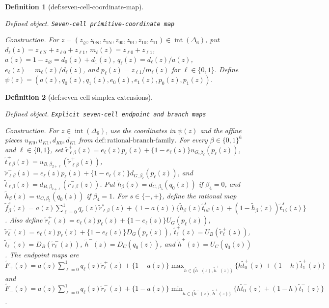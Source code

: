 \documentclass{article}
\newtheorem{definition}{Definition}
\begin{document}
\begin{definition}[def:seven-cell-coordinate-map]\label{def:seven-cell-coordinate-map}
\par\smallskip\noindent\emph{Defined object.} \texttt{Seven-\allowbreak{}cell primitive-\allowbreak{}coordinate map}
\par\smallskip\noindent\emph{Construction.} For \(z=(z_\varnothing,z_{0\mathrm N},z_{1\mathrm N},z_{00},z_{01},z_{10},z_{11})\in\operatorname{int}(\Delta_6)\), put \(d_\ell(z)=z_{\ell\mathrm N}+z_{\ell0}+z_{\ell1}\), \(m_\ell(z)=z_{\ell0}+z_{\ell1}\), \(a(z)=1-z_\varnothing=d_0(z)+d_1(z)\), \(q_\ell(z)=d_\ell(z)/a(z)\), \(e_\ell(z)=m_\ell(z)/d_\ell(z)\), and \(p_\ell(z)=z_{\ell1}/m_\ell(z)\) for \(\ell\in\{0,1\}\). Define \(\psi(z)=(a(z),q_0(z),q_1(z),e_0(z),e_1(z),p_0(z),p_1(z))\).
\end{definition}

\begin{definition}[def:seven-cell-simplex-extensions]\label{def:seven-cell-simplex-extensions}
\par\smallskip\noindent\emph{Defined object.} \texttt{Explicit seven-\allowbreak{}cell endpoint and branch maps}
\par\smallskip\noindent\emph{Construction.} For \(z\in\operatorname{int}(\Delta_6)\), use the coordinates in \(\psi(z)\) and the affine pieces \(u_{K0},u_{K1},d_{K0},d_{K1}\) from \(\mathrm{def{:}rational\text{-}branch\text{-}family}\). For every \(\beta\in\{0,1\}^6\) and \(\ell\in\{0,1\}\), set \(\widetilde r_{\ell\beta}^+(z)=e_\ell(z)p_\ell(z)+\{1-e_\ell(z)\}u_{G,\beta_\ell}(p_\ell(z))\), \(\widetilde t_{\ell\beta}^+(z)=u_{B,\beta_{2+\ell}}(\widetilde r_{\ell\beta}^+(z))\), \(\widetilde r_{\ell\beta}^-(z)=e_\ell(z)p_\ell(z)+\{1-e_\ell(z)\}d_{G,\beta_\ell}(p_\ell(z))\), and \(\widetilde t_{\ell\beta}^-(z)=d_{B,\beta_{2+\ell}}(\widetilde r_{\ell\beta}^-(z))\). Put \(\widetilde h_\beta(z)=d_{C,\beta_5}(q_0(z))\) if \(\beta_4=0\), and \(\widetilde h_\beta(z)=u_{C,\beta_5}(q_0(z))\) if \(\beta_4=1\). For \(s\in\{-,+\}\), define the rational map \(\widetilde f_\beta^s(z)=a(z)\sum_{\ell=0}^1q_\ell(z)\widetilde r_{\ell\beta}^s(z)+(1-a(z))\{\widetilde h_\beta(z)\widetilde t_{0\beta}^s(z)+(1-\widetilde h_\beta(z))\widetilde t_{1\beta}^s(z)\}\). Also define \(\widetilde r_\ell^+(z)=e_\ell(z)p_\ell(z)+\{1-e_\ell(z)\}U_G(p_\ell(z))\), \(\widetilde r_\ell^-(z)=e_\ell(z)p_\ell(z)+\{1-e_\ell(z)\}D_G(p_\ell(z))\), \(\widetilde t_\ell^+(z)=U_B(\widetilde r_\ell^+(z))\), \(\widetilde t_\ell^-(z)=D_B(\widetilde r_\ell^-(z))\), \(\widetilde h^-(z)=D_C(q_0(z))\), and \(\widetilde h^+(z)=U_C(q_0(z))\). The endpoint maps are \(\widetilde F_+(z)=a(z)\sum_{\ell=0}^1q_\ell(z)\widetilde r_\ell^+(z)+\{1-a(z)\}\max_{h\in\{\widetilde h^-(z),\widetilde h^+(z)\}}\{h\widetilde t_0^+(z)+(1-h)\widetilde t_1^+(z)\}\) and \(\widetilde F_-(z)=a(z)\sum_{\ell=0}^1q_\ell(z)\widetilde r_\ell^-(z)+\{1-a(z)\}\min_{h\in\{\widetilde h^-(z),\widetilde h^+(z)\}}\{h\widetilde t_0^-(z)+(1-h)\widetilde t_1^-(z)\}\).
\end{definition}
\end{document}
